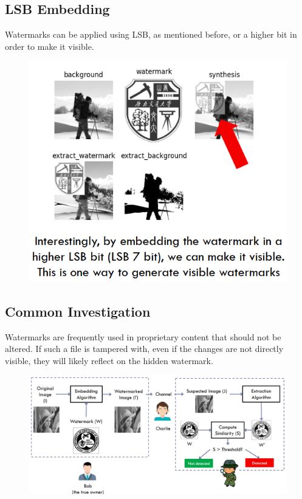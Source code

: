 \documentclass[10pt,a4paper]{report}
\begin{document}
\subsection{LSB Embedding}
Watermarks can be applied using LSB, as mentioned before, or a higher bit in order to make it visible.
\begin{figure}[H]
\centering
\includegraphics[scale=0.5]{6.png}
\end{figure}
\subsection{Common Investigation}
Watermarks are frequently used in proprietary content that should not be altered. If such a file is tampered with, even if the changes are not directly visible, they will likely reflect on the hidden watermark.
\begin{figure}[H]
\centering
\includegraphics[scale=0.4]{7.png}
\end{figure}
\end{document}
